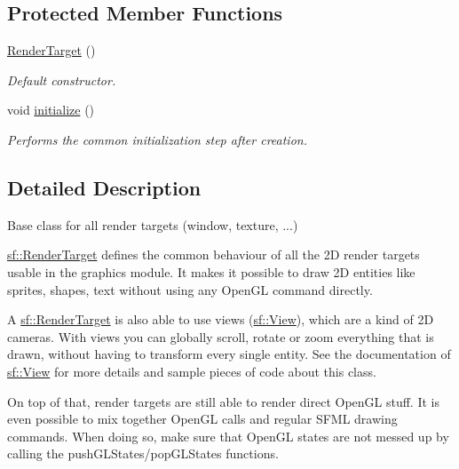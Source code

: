 \subsection*{Protected Member Functions}
\begin{DoxyCompactItemize}
\item 
\hypertarget{classsf_1_1_render_target_a2997c96cbd93cb8ce0aba2ddae35b86f}{\hyperlink{classsf_1_1_render_target_a2997c96cbd93cb8ce0aba2ddae35b86f}{Render\+Target} ()}\label{classsf_1_1_render_target_a2997c96cbd93cb8ce0aba2ddae35b86f}

\begin{DoxyCompactList}\small\item\em Default constructor. \end{DoxyCompactList}\item 
void \hyperlink{classsf_1_1_render_target_af530274b34159d644e509b4b4dc43eb7}{initialize} ()
\begin{DoxyCompactList}\small\item\em Performs the common initialization step after creation. \end{DoxyCompactList}\end{DoxyCompactItemize}


\subsection{Detailed Description}
Base class for all render targets (window, texture, ...) 

\hyperlink{classsf_1_1_render_target}{sf\+::\+Render\+Target} defines the common behaviour of all the 2\+D render targets usable in the graphics module. It makes it possible to draw 2\+D entities like sprites, shapes, text without using any Open\+G\+L command directly.

A \hyperlink{classsf_1_1_render_target}{sf\+::\+Render\+Target} is also able to use views (\hyperlink{classsf_1_1_view}{sf\+::\+View}), which are a kind of 2\+D cameras. With views you can globally scroll, rotate or zoom everything that is drawn, without having to transform every single entity. See the documentation of \hyperlink{classsf_1_1_view}{sf\+::\+View} for more details and sample pieces of code about this class.

On top of that, render targets are still able to render direct Open\+G\+L stuff. It is even possible to mix together Open\+G\+L calls and regular S\+F\+M\+L drawing commands. When doing so, make sure that Open\+G\+L states are not messed up by calling the push\+G\+L\+States/pop\+G\+L\+States functions.

